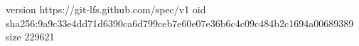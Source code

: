 version https://git-lfs.github.com/spec/v1
oid sha256:9a9c33e4dd71d6390ca6d799ceb7e60e07e36b6c4c09c484b2c1694a00689389
size 229621
